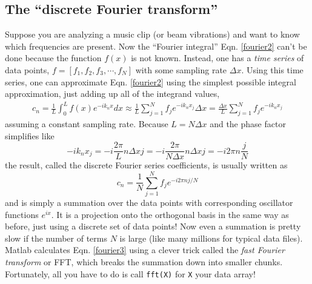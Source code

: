\documentclass[12pt]{article}
\begin{document}
\subsection{The ``discrete Fourier transform''}
Suppose you are analyzing a music clip (or beam vibrations) and want to know which frequencies are present. Now the ``Fourier integral'' Eqn. \ref{fourier2} can't be done because the function $f(x)$ is not known. Instead, one has a \textit{time series} of data points, $f = [f_1, f_2, f_3, \cdots, f_N]$ with some sampling rate $\Delta x$. Using this time series, one can approximate Eqn. \ref{fourier2} using the simplest possible integral approximation, just adding up all of the integrand values,
\begin{align}
  c_n = \frac{1}{L}\int_0^Lf(x)e^{-ik_nx}dx \approx \frac{1}{L}\sum_{j=1}^Nf_je^{-ik_nx_j}\Delta x = \frac{\Delta x}{L}\sum_{j=1}^N f_je^{-ik_nx_j}
\end{align}
assuming a constant sampling rate. Because $L = N\Delta x$ and the phase factor simplifies like
\begin{equation}
  -ik_nx_j = -i\frac{2\pi}{L}n\Delta x j = -i\frac{2\pi}{N\Delta x}n\Delta x j = -i2\pi n\frac{j}{N}
\end{equation}
the result, called the discrete Fourier series coefficients, is usually written as
\begin{equation}
  c_n = \frac{1}{N}\sum_{j=1}^Nf_je^{-i2\pi n j/N}\label{fourier3}
\end{equation}
and is simply a summation over the data points with corresponding oscillator functions $e^{ix}$. It is a projection onto the orthogonal basis in the same way as before, just using a discrete set of data points! Now even a summation is pretty slow if the number of terms $N$ is large (like many millions for typical data files). Matlab calculates Eqn. \ref{fourier3} using a clever trick called the \textit{fast Fourier transform} or FFT, which breaks the summation down into smaller chunks. Fortunately, all you have to do is call \texttt{fft(X)} for \texttt{X} your data array!
\end{document}
